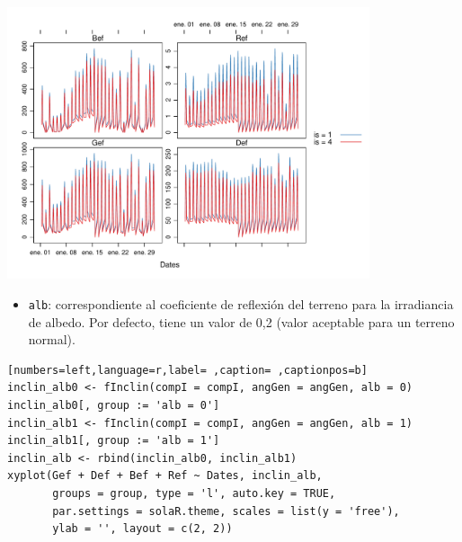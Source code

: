 \begin{itemize}
\begin{center}
\includegraphics[width=0.8\textwidth]{figuras/codigo-finclinis.pdf}
\end{center}
\begin{itemize}
\item \texttt{alb}: correspondiente al coeficiente de reflexión del terreno para la irradiancia de albedo. Por defecto, tiene un valor de 0,2 (valor aceptable para un terreno normal).
\end{itemize}
\begin{lstlisting}[numbers=left,language=r,label= ,caption= ,captionpos=b]
inclin_alb0 <- fInclin(compI = compI, angGen = angGen, alb = 0)
inclin_alb0[, group := 'alb = 0']
inclin_alb1 <- fInclin(compI = compI, angGen = angGen, alb = 1)
inclin_alb1[, group := 'alb = 1']
inclin_alb <- rbind(inclin_alb0, inclin_alb1)
xyplot(Gef + Def + Bef + Ref ~ Dates, inclin_alb,
       groups = group, type = 'l', auto.key = TRUE,
       par.settings = solaR.theme, scales = list(y = 'free'),
       ylab = '', layout = c(2, 2))
\end{lstlisting}


\end{itemize}
